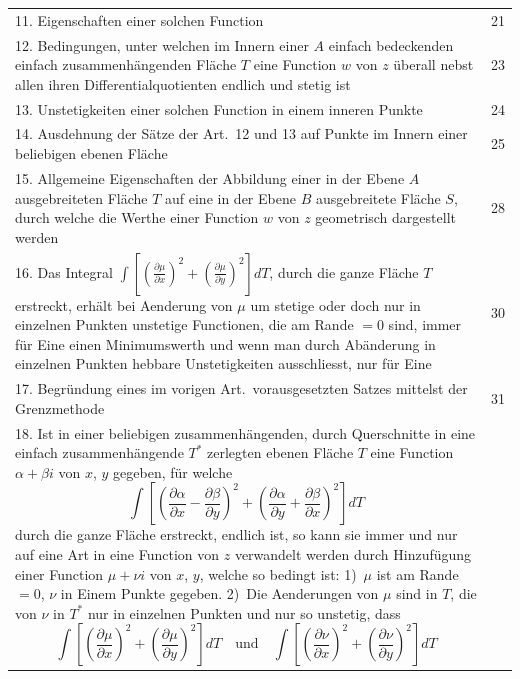 \documentclass[12pt,a4paper]{article}
\begin{document}
\newpage
\begin{center}
\begin{tabular}{p{}r}
11. Eigenschaften einer solchen Function \dotfill & 21\\[0.5em]
12. Bedingungen, unter welchen im Innern einer $A$ einfach bedeckenden einfach zusammenhängenden Fläche $T$ eine Function $w$ von $z$ überall nebst allen ihren Differentialquotienten endlich und stetig ist \dotfill & 23\\[0.5em]
13. Unstetigkeiten einer solchen Function in einem inneren Punkte \dotfill & 24\\[0.5em]
14. Ausdehnung der Sätze der Art.~12 und 13 auf Punkte im Innern einer beliebigen ebenen Fläche \dotfill & 25\\[0.5em]
15. Allgemeine Eigenschaften der Abbildung einer in der Ebene $A$ ausgebreiteten Fläche $T$ auf eine in der Ebene $B$ ausgebreitete Fläche $S$, durch welche die Werthe einer Function $w$ von $z$ geometrisch dargestellt werden \dotfill & 28\\[0.5em]
16. Das Integral $\int \left[\left(\frac{\partial \mu}{\partial x}\right)^2 + \left(\frac{\partial \mu}{\partial y}\right)^2\right] dT$, durch die ganze Fläche $T$ erstreckt, erhält bei Aenderung von $\mu$ um stetige oder doch nur in einzelnen Punkten unstetige Functionen, die am Rande $= 0$ sind, immer für Eine einen Minimumswerth und wenn man durch Abänderung in einzelnen Punkten hebbare Unstetigkeiten ausschliesst, nur für Eine \dotfill & 30\\[0.5em]
17. Begründung eines im vorigen Art.\ vorausgesetzten Satzes mittelst der Grenzmethode \dotfill & 31\\[0.5em]
18. Ist in einer beliebigen zusammenhängenden, durch Querschnitte in eine einfach zusammenhängende $T^*$ zerlegten ebenen Fläche $T$ eine Function $\alpha + \beta i$ von $x$, $y$ gegeben, für welche
\[
\int \left[\left(\frac{\partial \alpha}{\partial x} - \frac{\partial \beta}{\partial y}\right)^2 + \left(\frac{\partial \alpha}{\partial y} + \frac{\partial \beta}{\partial x}\right)^2\right] dT
\]
durch die ganze Fläche erstreckt, endlich ist, so kann sie immer und nur auf eine Art in eine Function von $z$ verwandelt werden durch Hinzufügung einer Function $\mu + \nu i$ von $x$, $y$, welche so bedingt ist: 1)~$\mu$ ist am Rande $= 0$, $\nu$ in Einem Punkte gegeben. 2)~Die Aenderungen von $\mu$ sind in $T$, die von $\nu$ in $T^*$ nur in einzelnen Punkten und nur so unstetig, dass
\[
\int \left[\left(\frac{\partial \mu}{\partial x}\right)^2 + \left(\frac{\partial \mu}{\partial y}\right)^2\right] dT \quad \text{und} \quad \int \left[\left(\frac{\partial \nu}{\partial x}\right)^2 + \left(\frac{\partial \nu}{\partial y}\right)^2\right] dT
\]
\end{tabular}
\end{center}
\end{document}
